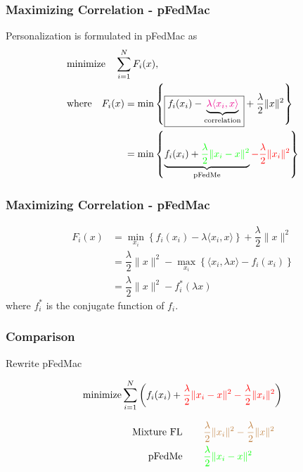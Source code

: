
\begin{frame}
\frametitle{Maximizing Correlation - pFedMac}

Personalization is formulated in pFedMac \cite{li2021pfedmac} as
\begin{align*}
    & \text{minimize} \quad \sum\limits_{i=1}^N F_i(x), \\
    & \text{where} \quad F_i(x) = \min \left\{ \framebox{$f_i(x_i) - \underbrace{\color{magenta} \lambda \langle x_i, x \rangle}_{\text{correlation}}$}  + \dfrac{\lambda}{2} \lVert x \rVert^2 \right\} \\
    & \phantom{\text{where} \quad F_i(x)} = \min \left\{ \underbrace{f_i(x_i) + {\color{green} \dfrac{\lambda}{2} \lVert x_i - x \rVert^2}}_{\text{pFedMe}} {\color{red}- \dfrac{\lambda}{2} \lVert x_i \rVert^2} \right\}
\end{align*}


\end{frame}


\begin{frame}
\frametitle{Maximizing Correlation - pFedMac}

\begin{align*}
    F_i(x) & = \min_{x_i}\left\{ f_i(x_i) - \lambda \langle x_i, x \rangle \right\} + \dfrac{\lambda}{2} \lVert x \rVert^2 \\
    & = \dfrac{\lambda}{2} \lVert x \rVert^2 - \max_{x_i} \left\{ \langle x_i, \lambda x \rangle - f_i(x_i) \right\} \\
    & = \dfrac{\lambda}{2} \lVert x \rVert^2 - f_i^*(\lambda x)
\end{align*}
where $f_i^*$ is the conjugate function of $f_i$.

\end{frame}


\begin{frame}
\frametitle{Comparison}

Rewrite pFedMac

$$\text{minimize} \sum\limits_{i=1}^N \left( f_i(x_i) + {\color{red} \dfrac{\lambda}{2} \lVert x_i - x \rVert^2 - \dfrac{\lambda}{2} \lVert x_i \rVert^2} \right)$$

\pause
{\smaller
\begin{align*}
    \phantom{aaaaaaaa} \text{Mixture FL} & \phantom{aaaa} {\color{brown} \dfrac{\lambda}{2} \lVert x_i \rVert^2 -\dfrac{\lambda}{2} \lVert x \rVert^2} \\
    \phantom{aaaaaaaa} \text{pFedMe} & \phantom{aaaa} {\color{green} \dfrac{\lambda}{2} \lVert x_i - x \rVert^2}
\end{align*}
}

\end{frame}

